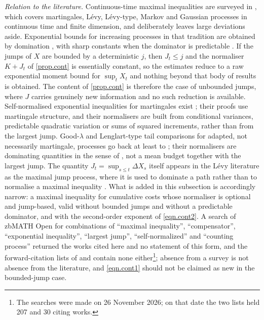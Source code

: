 \documentclass[12pt,oneside,reqno,fleqn]{amsart}
\numberwithin{equation}{section}
\theoremstyle{remark}
\newcommand{\1}{{\mathbf 1}}
\renewcommand{\le}{\leq}
\begin{document}
	\medskip
	\noindent\textit{Relation to the literature.} Continuous-time maximal inequalities are surveyed in \cite{kuhn2022maximal}, which covers martingales, L\'evy, L\'evy-type, Markov and Gaussian processes in continuous time and finite dimension, and deliberately leaves large deviations aside. Exponential bounds for increasing processes in that tradition are obtained by domination \cite{MR0471069,LLP80}, with sharp constants when the dominator is predictable \cite{GS21}. If the jumps of $X$ are bounded by a deterministic $j$, then $J_t\le j$ and the normaliser $K+J_t$ of \cref{prop.cont} is essentially constant, so the estimates reduce to a raw exponential moment bound for $\sup_tX_t$ and nothing beyond that body of results is obtained. The content of \cref{prop.cont} is therefore the case of unbounded jumps, where $J$ carries genuinely new information and no such reduction is available. Self-normalised exponential inequalities for martingales exist \cite{BT08,FGL15,MR2488094}; their proofs use martingale structure, and their normalisers are built from conditional variances, predictable quadratic variation or sums of squared increments, rather than from the largest jump. Good-$\lambda$ and Lenglart-type tail comparisons for adapted, not necessarily martingale, processes go back at least to \cite{dlaP93}; their normalisers are dominating quantities in the sense of \cite{MR0471069}, not a mean budget together with the largest jump. The quantity $J_t=\sup_{s\le t}\Delta X_s$ itself appears in the L\'evy literature as the maximal jump process, where it is used to dominate a path rather than to normalise a maximal inequality \cite{BFM16}. What is added in this subsection is accordingly narrow: a maximal inequality for cumulative costs whose normaliser is optional and jump-based, valid without bounded jumps and without a predictable dominator, and with the second-order exponent of \eqref{eqn.cont2}. A search of zbMATH Open for combinations of ``maximal inequality'', ``compensator'', ``exponential inequality'', ``largest jump'', ``self-normalized'' and ``counting process'' returned the works cited here and no statement of this form, and the forward-citation lists of \cite{MR0471069} and \cite{kuhn2022maximal} contain none either\footnote{The searches were made on 26 November 2026; on that date the two lists held 207 and 30 citing works.}; absence from a survey is not absence from the literature, and \eqref{eqn.cont1} should not be claimed as new in the bounded-jump case.
\end{document}
